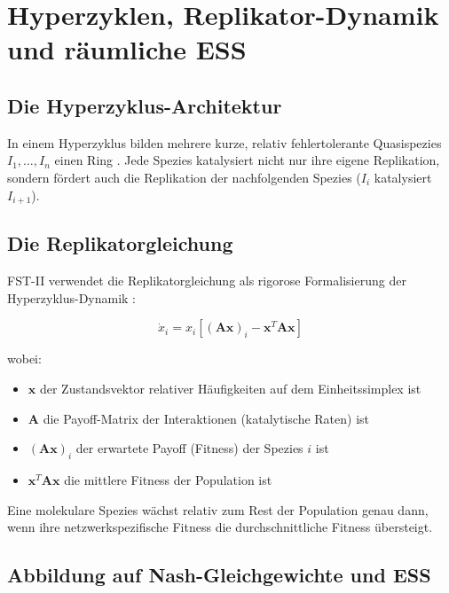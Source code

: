 \documentclass[12pt,a4paper]{article}
\theoremstyle{remark}
\begin{document}
\section{Hyperzyklen, Replikator-Dynamik und r\"aumliche ESS}
\label{sec:hypercycles}

\subsection{Die Hyperzyklus-Architektur}

In einem Hyperzyklus bilden mehrere kurze, relativ fehlertolerante Quasispezies $I_1, \ldots, I_n$ einen Ring \citep{Eigen1979}. Jede Spezies katalysiert nicht nur ihre eigene Replikation, sondern f\"ordert auch die Replikation der nachfolgenden Spezies ($I_i$ katalysiert $I_{i+1}$).

\subsection{Die Replikatorgleichung}

FST-II verwendet die Replikatorgleichung als rigorose Formalisierung der Hyperzyklus-Dynamik \citep{ReplicatorEntropy,ReplicatorDiffusion}:

\begin{equation}
\dot{x}_i = x_i \left[ (\mathbf{A}\mathbf{x})_i - \mathbf{x}^T \mathbf{A} \mathbf{x} \right]
\end{equation}

wobei:
\begin{itemize}
    \item $\mathbf{x}$ der Zustandsvektor relativer H\"aufigkeiten auf dem Einheitssimplex ist
    \item $\mathbf{A}$ die Payoff-Matrix der Interaktionen (katalytische Raten) ist
    \item $(\mathbf{A}\mathbf{x})_i$ der erwartete Payoff (Fitness) der Spezies $i$ ist
    \item $\mathbf{x}^T \mathbf{A} \mathbf{x}$ die mittlere Fitness der Population ist
\end{itemize}

Eine molekulare Spezies w\"achst relativ zum Rest der Population genau dann, wenn ihre netzwerkspezifische Fitness die durchschnittliche Fitness \"ubersteigt.

\subsection{Abbildung auf Nash-Gleichgewichte und ESS}
\end{document}
